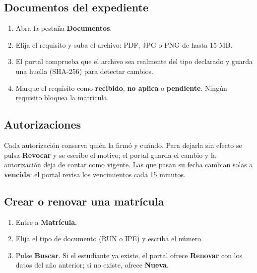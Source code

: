 \subsection{Documentos del expediente}


\begin{enumerate}[leftmargin=*,itemsep=0.2em]
\item Abra la pestaña \textbf{Documentos}.
\item Elija el requisito y suba el archivo: PDF, JPG o PNG de hasta 15 MB.
\item El portal comprueba que el archivo sea realmente del tipo declarado y
  guarda una huella (SHA-256) para detectar cambios.
\item Marque el requisito como \textbf{recibido}, \textbf{no aplica} o
  \textbf{pendiente}. Ningún requisito bloquea la matrícula.
\end{enumerate}

\subsection{Autorizaciones}


Cada autorización conserva quién la firmó y cuándo. Para dejarla sin efecto se
pulsa \textbf{Revocar} y se escribe el motivo; el portal guarda el cambio y la
autorización deja de contar como vigente. Las que pasan su fecha cambian solas
a \textbf{vencida}: el portal revisa los vencimientos cada 15 minutos.

\subsection{Crear o renovar una matrícula}

\begin{enumerate}[leftmargin=*,itemsep=0.2em]
\item Entre a \textbf{Matrícula}.
\item Elija el tipo de documento (RUN o IPE) y escriba el número.
\item Pulse \textbf{Buscar}. Si el estudiante ya existe, el portal ofrece
  \textbf{Renovar} con los datos del año anterior; si no existe, ofrece
  \textbf{Nueva}.
\end{enumerate}

